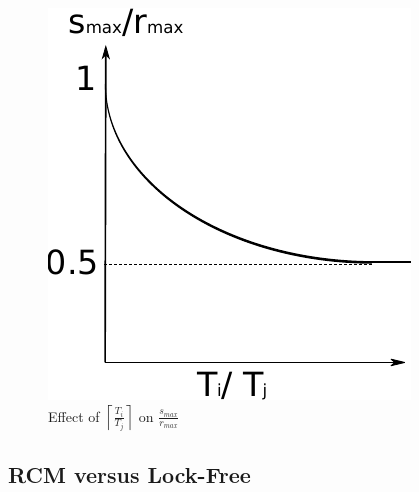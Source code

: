 \documentclass[12pt,english]{report}
\begin{document}
\begin{figure}
\begin{centering}
\includegraphics[scale=0.5]{figures/figure14}
\par\end{centering}
\caption{\label{fig14}Effect of $\left\lceil\frac{T_{i}}{T_{j}}\right\rceil$ on
$\frac{s_{max}}{r_{max}}$}
\end{figure}


\subsection{RCM versus Lock-Free}
\end{document}
